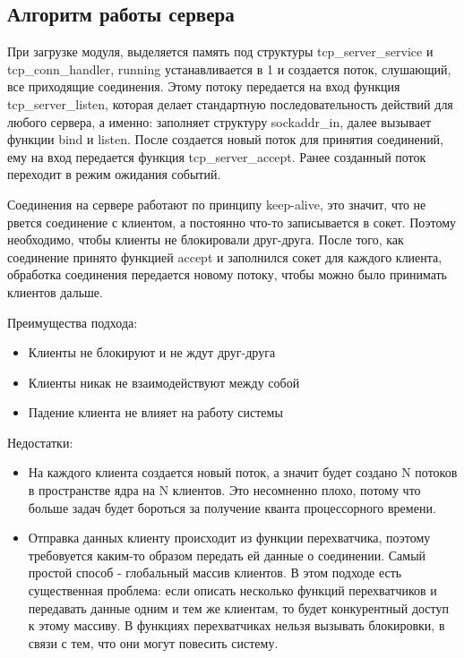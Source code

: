 \subsection{Алгоритм работы сервера}

При загрузке модуля, выделяется память под структуры tcp\_server\_service и tcp\_conn\_handler, running устанавливается в 1 и создается поток, слушающий, все приходящие соединения. Этому потоку передается на вход функция tcp\_server\_listen, которая делает стандартную последовательность действий для любого сервера, а именно: заполняет структуру sockaddr\_in, далее вызывает функции bind и listen. После создается новый поток для принятия соединений, ему на вход передается функция tcp\_server\_accept. Ранее созданный поток переходит в режим ожидания событий. 

Соединения на сервере работают по принципу keep-alive, это значит, что не рвется соединение с клиентом, а постоянно что-то записывается в сокет. Поэтому необходимо, чтобы клиенты не блокировали друг-друга. После того, как соединение принято функцией accept и заполнился сокет для каждого клиента, обработка соединения передается новому потоку, чтобы можно было принимать клиентов дальше.

Преимущества подхода:
\begin{itemize}
	\item Клиенты не блокируют и не ждут друг-друга
	\item Клиенты никак не взаимодействуют между собой
	\item Падение клиента не влияет на работу системы
\end{itemize}

Недостатки:
\begin{itemize}
	\item На каждого клиента создается новый поток, а значит будет создано N потоков в пространстве ядра на N клиентов. Это несомненно плохо, потому что больше задач будет бороться за получение кванта процессорного времени.
	\item Отправка данных клиенту происходит из функции перехватчика, поэтому требовуется каким-то образом передать ей данные о соединении. Самый простой способ - глобальный массив клиентов. В этом подходе есть существенная проблема: если описать несколько функций перехватчиков и передавать данные одним и тем же клиентам, то будет конкурентный доступ к этому массиву. В функциях перехватчиках нельзя вызывать блокировки, в связи с тем, что они могут повесить систему.
\end{itemize}



